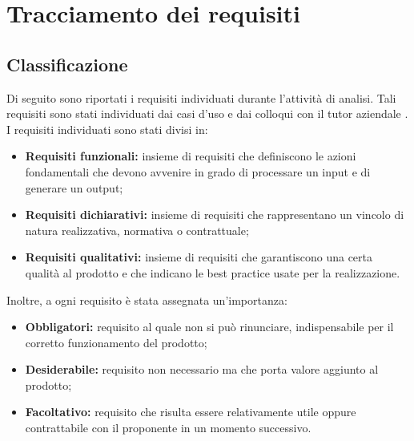 \section{Tracciamento dei requisiti}\label{sec:tracciamento-dei-requisiti}
\setcounter{rowcount}{0}
\setcounter{subCount}{0}

\subsection{Classificazione}\label{subsec:classificazione}
Di seguito sono riportati i requisiti individuati durante l'attività di analisi.
Tali requisiti sono stati individuati dai casi d'uso e dai colloqui con il tutor aziendale \tutorAziendale.
I requisiti individuati sono stati divisi in:
\begin{itemize}
    \item \textbf{Requisiti funzionali:} insieme di requisiti che definiscono le azioni fondamentali che devono avvenire in grado di processare un input e di generare un output;
    \item \textbf{Requisiti dichiarativi:} insieme di requisiti che rappresentano un vincolo di natura realizzativa, normativa o contrattuale;
    \item \textbf{Requisiti qualitativi:} insieme di requisiti che garantiscono una certa qualità al prodotto e che indicano le best practice usate per la realizzazione.
\end{itemize}
Inoltre, a ogni requisito è stata assegnata un'importanza:
\begin{itemize}
    \item \textbf{Obbligatori:} requisito al quale non si può rinunciare, indispensabile per il corretto funzionamento del prodotto;
    \item \textbf{Desiderabile:} requisito non necessario ma che porta valore aggiunto al prodotto;
    \item \textbf{Facoltativo:} requisito che risulta essere relativamente utile oppure contrattabile con il proponente in un momento successivo.
\end{itemize}

